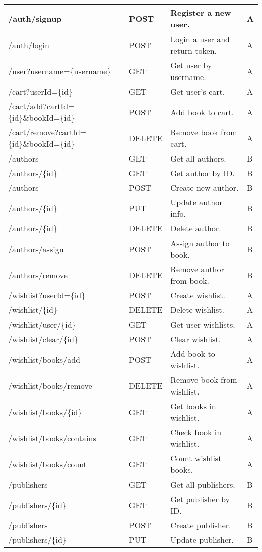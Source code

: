 \begin{longtable}{|p{}|p{} |p{}|p{}|}
/auth/signup & POST & Register a new user. & A \\
\hline
/auth/login & POST & Login a user and return token. & A \\
\hline
/user?username=\{username\} & GET & Get user by username. & A \\
\hline
/cart?userId=\{id\} & GET & Get user’s cart. & A \\
\hline
/cart/add?cartId=\{id\}\&bookId=\{id\} & POST & Add book to cart. & A \\
\hline
/cart/remove?cartId=\{id\}\&bookId=\{id\} & DELETE & Remove book from cart. & A \\
\hline
/authors & GET & Get all authors. & B \\
\hline
/authors/\{id\} & GET & Get author by ID. & B \\
\hline
/authors & POST & Create new author. & B \\
\hline
/authors/\{id\} & PUT & Update author info. & B \\
\hline
/authors/\{id\} & DELETE & Delete author. & B \\
\hline
/authors/assign & POST & Assign author to book. & B \\
\hline
/authors/remove & DELETE & Remove author from book. & B \\
\hline
/wishlist?userId=\{id\} & POST & Create wishlist. & A \\
\hline
/wishlist/\{id\} & DELETE & Delete wishlist. & A \\
\hline
/wishlist/user/\{id\} & GET & Get user wishlists. & A \\
\hline
/wishlist/clear/\{id\} & POST & Clear wishlist. & A \\
\hline
/wishlist/books/add & POST & Add book to wishlist. & A \\
\hline
/wishlist/books/remove & DELETE & Remove book from wishlist. & A \\
\hline
/wishlist/books/\{id\} & GET & Get books in wishlist. & A \\
\hline
/wishlist/books/contains & GET & Check book in wishlist. & A \\
\hline
/wishlist/books/count & GET & Count wishlist books. & A \\
\hline
/publishers & GET & Get all publishers. & B \\
\hline
/publishers/\{id\} & GET & Get publisher by ID. & B \\
\hline
/publishers & POST & Create publisher. & B \\
\hline
/publishers/\{id\} & PUT & Update publisher. & B \\

\end{longtable}
